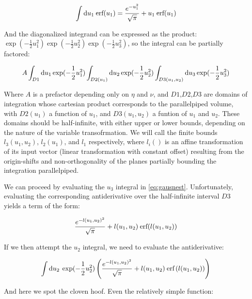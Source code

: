 \documentclass[10pt,letterpaper]{article}
\def\d{{\rm d}}  %
\begin{document}
\begin{equation} \label{eq:erfint}
\int \d u_1 \hspace{0.2pc}  \text{erf}(u_1) = \frac{e^{-u_1^2}}{\sqrt{\pi}} + u_1  \hspace{0.2pc}  \text{erf}(u_1)
\end{equation}

And the diagonalized integrand can be expressed as the product: $\exp(-\frac{1}{2} u_1^2) \exp(-\frac{1}{2} u_2^2) \exp(-\frac{1}{2} u_3^2)$, so the integral can be partially factored:

\begin{equation} \label{eq:gausnest}
A \int_{D1} \d u_1 \exp(-\frac{1}{2} u_1^2) \int_{D2(u_1)} \d u_2 \exp(-\frac{1}{2} u_2^2) \int_{D3(u_1,u_2)} \d u_3 \exp(-\frac{1}{2} u_3^2)
\end{equation}

Where $A$ is a prefactor depending only on $\eta$ and $\nu$, and $D1$,$D2$,$D3$ are domains of integration whose cartesian product corresponds to the parallelpiped volume, with $D2(u_1)$ a function of $u_1$, and $D3(u_1,u_2)$ a funtion of $u_1$ and $u_2$. These domains should be half-infinite, with either upper or lower bounds, depending on the nature of the variable transofrmation. We will call the finite bounds $l_3(u_1,u_2)$, $l_2(u_1)$, and $l_1$ respectively, where $l_i()$ is an affine transformation of its input vector (linear transformation with constant offset) resulting from the origin-shifts and non-orthogonality of the planes partially bounding the integration parallelpiped.

We can proceed by evaluating the $u_3$ integral in \ref{eq:gausnest}. Unfortunately, evaluating the corresponding antiderivative over the half-infinite interval $D3$ yields a term of the form: 

$$\frac{e^{-l(u_1,u_2)^2}}{\sqrt{\pi}} + l(u_1,u_2) \hspace{0.2pc}  \text{erf}(l(u_1,u_2))$$ 

If we then attempt the $u_2$ integral, we need to evaluate the antiderivative: 

\begin{equation*}
\int \d u_2  \hspace{0.2pc} \exp(-\frac{1}{2} u_2^2) \left(\dfrac{e^{-l(u_1,u_2)^2}}{\sqrt{\pi}} + l(u_1,u_2) \hspace{0.2pc} \text{erf}\left(l(u_1,u_2)\right)\right)
\end{equation*}

And here we spot the cloven hoof. Even the relatively simple function:
\end{document}
